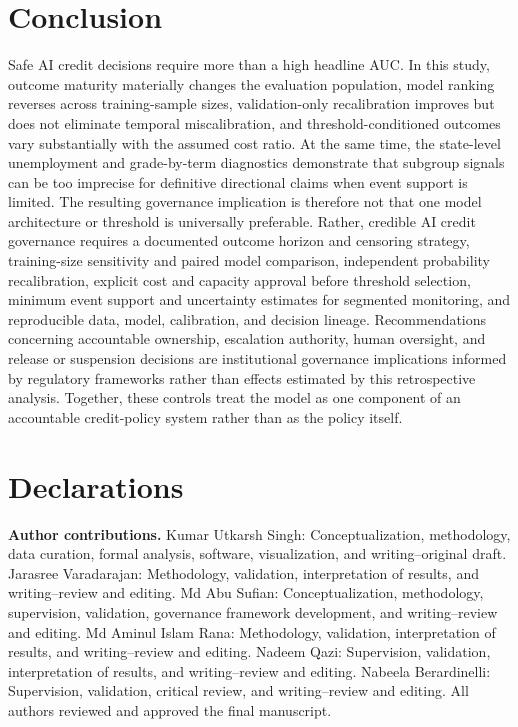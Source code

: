 \documentclass[10pt]{article}
\begin{document}
\section{Conclusion}

Safe AI credit decisions require more than a high headline AUC. In this study, outcome maturity materially changes the evaluation population, model ranking reverses across training-sample sizes, validation-only recalibration improves but does not eliminate temporal miscalibration, and threshold-conditioned outcomes vary substantially with the assumed cost ratio. At the same time, the state-level unemployment and grade-by-term diagnostics demonstrate that subgroup signals can be too imprecise for definitive directional claims when event support is limited. The resulting governance implication is therefore not that one model architecture or threshold is universally preferable. Rather, credible AI credit governance requires a documented outcome horizon and censoring strategy, training-size sensitivity and paired model comparison, independent probability recalibration, explicit cost and capacity approval before threshold selection, minimum event support and uncertainty estimates for segmented monitoring, and reproducible data, model, calibration, and decision lineage. Recommendations concerning accountable ownership, escalation authority, human oversight, and release or suspension decisions are institutional governance implications informed by regulatory frameworks rather than effects estimated by this retrospective analysis. Together, these controls treat the model as one component of an accountable credit-policy system rather than as the policy itself.

 \section*{Declarations}

 \noindent\textbf{Author contributions.}
 Kumar Utkarsh Singh: Conceptualization, methodology, data curation, formal analysis, software, visualization, and writing--original draft.
 Jarasree Varadarajan: Methodology, validation, interpretation of results, and writing--review and editing.
 Md Abu Sufian: Conceptualization, methodology, supervision, validation, governance framework development, and writing--review and editing.
 Md Aminul Islam Rana: Methodology, validation, interpretation of results, and writing--review and editing.
 Nadeem Qazi: Supervision, validation, interpretation of results, and writing--review and editing.
 Nabeela Berardinelli: Supervision, validation, critical review, and writing--review and editing.
 All authors reviewed and approved the final manuscript.
\end{document}
